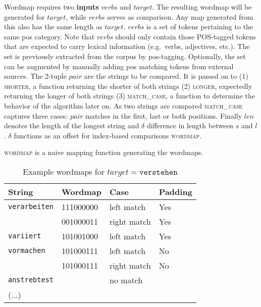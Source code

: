 
Wordmap requires two \textbf{inputs} $verbs$ and $target$.
The resulting wordmap will be generated for $target$, while $verbs$ serves as comparison.
Any map generated from this also has the same length as $target$.
$verbs$ is a set of tokens pertaining to the same \ac{pos} category.
Note that $verbs$ should only contain those POS-tagged tokens that are expected to carry lexical information (e.g.\ verbs, adjectives, etc.).
The set is previously extracted from the corpus by \ac{pos}\hyphen tagging.
Optionally, the set can be augmented by manually adding \ac{pos} matching tokens from external sources.
The 2-tuple $pair$ are the strings to be compared.
It is passed on to (1) \textsc{shorter}, a function returning the shorter of both strings (2) \textsc{longer}, expectedly returning the longer of both strings (3) \textsc{match\_case}, a function to determine the behavior of the algorithm later on.
As two strings are compared \textsc{match\_case} captures three cases: $pair$ matches in the first, last or both positions.
Finally $len$ denotes the length of the longest string and $\delta$ difference in length between $s$ and $l$.
$\delta$ functions as an offset for index-based comparisons \textsc{wordmap}.

\textsc{wordmap} is a naive mapping function generating the wordmaps.


\begin{table}
    \centering
    \caption{Example wordmaps for $target = \texttt{verstehen}$}
    \label{tab:wordmaps}
    \begin{tabular}{llll}
        \toprule
        \textbf{String} & \textbf{Wordmap} & \textbf{Case} & \textbf{Padding} \\
        \midrule
        \texttt{verarbeiten} & 111000000 & left match & Yes \\
         & 001000011 & right match & Yes \\
        \texttt{variiert} & 101001000 & left match & Yes \\
        \texttt{vormachen} & 101000111 & left match & No \\
        & 101000111 & right match & No \\
        \texttt{anstrebtest} &  & no match &   \\
        (...) &  &  &  \\
        \bottomrule
    \end{tabular}
\end{table}

